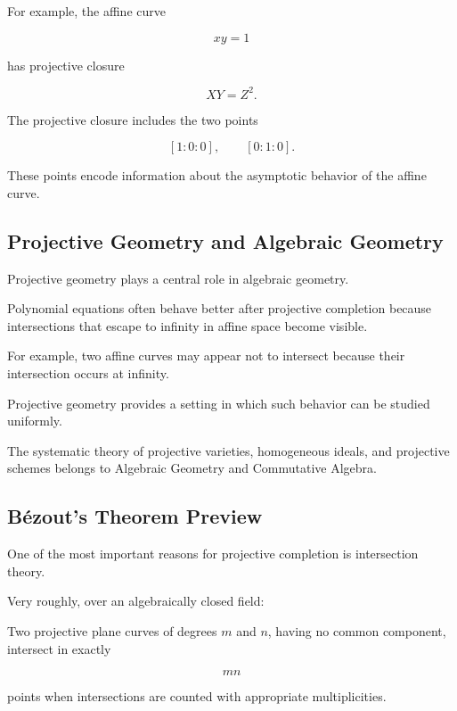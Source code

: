 For example, the affine curve

\[
xy=1
\]

has projective closure

\[
XY=Z^2.
\]

The projective closure includes the two points

\[
[1:0:0],
\qquad
[0:1:0].
\]

These points encode information about the asymptotic behavior of the affine
curve.

\subsection{Projective Geometry and Algebraic Geometry}
\label{subsec:projective-algebraic-geometry}

Projective geometry plays a central role in algebraic geometry.

Polynomial equations often behave better after projective completion because
intersections that escape to infinity in affine space become visible.

For example, two affine curves may appear not to intersect because their
intersection occurs at infinity.

Projective geometry provides a setting in which such behavior can be studied
uniformly.

The systematic theory of projective varieties, homogeneous ideals, and
projective schemes belongs to Algebraic Geometry and Commutative Algebra.

\subsection{Bézout's Theorem Preview}
\label{subsec:bezout-preview}

One of the most important reasons for projective completion is intersection
theory.

Very roughly, over an algebraically closed field:

\begin{theorem}
Two projective plane curves of degrees \(m\) and \(n\), having no common
component, intersect in exactly

\[
\boxed{mn}
\]

points when intersections are counted with appropriate multiplicities.
\end{theorem}

